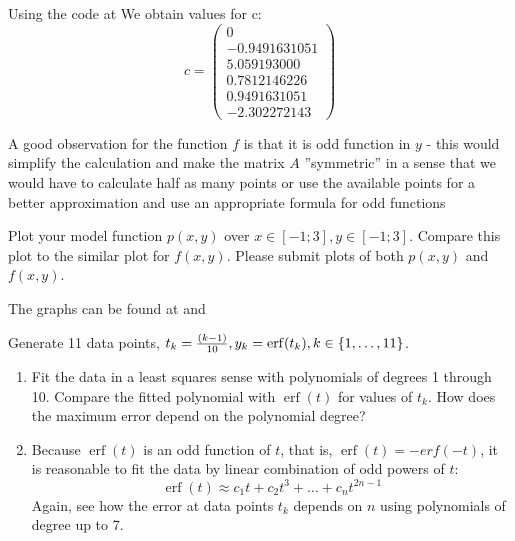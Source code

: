 \documentclass[a4paper, oneside]{article}
\begin{document}
\begin{solution}
    Using the code at 
    We obtain values for c:
    \begin{equation}
        c = \begin{pmatrix}
            0 \\ 
            -0.9491631051 \\
            5.059193000 \\
            0.7812146226 \\
            0.9491631051 \\
            -2.302272143
        \end{pmatrix}
    \end{equation}
\end{solution}
\begin{remark}
    A good observation for the function $f$ is that it is odd function in $y$ - this would simplify the calculation and make the matrix $A$ ''symmetric'' in a sense that we would have to calculate half as many points or use the available points for a better approximation and use an appropriate formula for odd functions
\end{remark}
\begin{problem}
    Plot your model function $p(x, y)$ over $x \in [-1; 3], y \in [-1; 3]$. Compare this plot to the similar plot for $f (x, y)$. Please submit plots of both $p(x, y)$ and $f(x, y)$.
\end{problem}
\begin{solution}
    The graphs can be found at  and 
\end{solution}
\newpage
\begin{problem}
    Generate 11 data points, $t_k = \frac{(k-1)}{10}, y_k = \operatorname{erf}(t_k), k \in \left\{1, \dots , 11\right\}$.
    \begin{enumerate}
        \item Fit the data in a least squares sense with polynomials of degrees 1 through 10. Compare the fitted polynomial with $\operatorname{erf}(t)$ for values of $t_k$. How does the maximum error depend on the polynomial degree?
        \item Because $\operatorname{erf}(t)$ is an odd function of $t$, that is, $\operatorname{erf}(t) = -erf(-t)$, it is reasonable to fit the data by linear combination of odd powers of $t$:
        \begin{equation}
            \operatorname{erf}(t) \approx c_1 t + c_2 t^3 + \dots + c_n t^{2n-1}
        \end{equation}
        Again, see how the error at data points $t_k$ depends on $n$ using polynomials of degree up to 7.
    \end{enumerate}
\end{problem}
\end{document}
